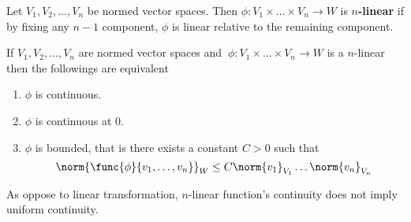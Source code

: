 \begin{definition}
    Let \(V_1, V_2 ,\dots , V_n\) be  normed vector spaces. Then \(\phi : V_1 \times \dots \times V_n \to W\) is \textbf{\(n\)-linear} if by fixing any \(n-1\) component, \(\phi\) is linear relative to the remaining component.
\end{definition}

\begin{proposition}
    If \(V_1, V_2, \dots , V_n\) are  normed vector spaces and \(\ \phi : V_1 \times \dots \times V_n \to W \) is a \(n\)-linear then the followings are equivalent
    \begin{enumerate}
        \item \(\phi\) is continuous. \label{it:nLP_1}
        \item \(\phi\) is continuous at 0. \label{it:nLP_2}
        \item \(\phi\) is bounded, that is there exists a constant \(C > 0\) such that \label{it:nLP_3}
              \begin{equation*}
                  \norm{\func{\phi}{v_1, \dots ,v_n}}_W \leq C \norm{v_1}_{V_1} \dots \norm{v_n}_{V_n}
              \end{equation*}
    \end{enumerate}
\end{proposition}

\begin{remark}
    As oppose to linear transformation, \(n\)-linear function's continuity does not imply uniform continuity.
\end{remark}

